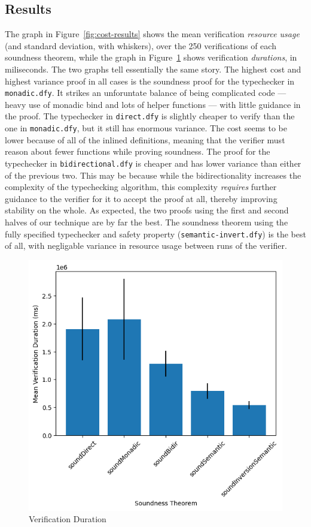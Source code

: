 \documentclass[sigplan,review,screen,anonymous]{acmart}
\begin{document}
\subsection*{Results}
The graph in Figure~\ref{fig:cost-results} shows the mean verification \emph{resource usage} (and standard deviation, with whiskers), over the 250 verifications of each soundness theorem,
while the graph in Figure~\ref{fig:dur-results} shows verification \emph{durations}, in miliseconds. The two graphs tell essentially the same story.
The highest cost and highest variance proof in all cases is the soundness proof for the typechecker in \texttt{monadic.dfy}. It strikes an unforuntate balance of being complicated code --- heavy use of monadic bind and lots of helper functions --- with little guidance in the proof.
The typechecker in \texttt{direct.dfy} is slightly cheaper to verify than the one in \texttt{monadic.dfy}, but it still has enormous variance. The cost seems to be lower because of all of the inlined definitions,
meaning that the verifier must reason about fewer functions while proving soundness.
The proof for the typechecker in \texttt{bidirectional.dfy} is cheaper and has lower variance than either of the previous two. This may be because while the bidirectionality increases the complexity of the typechecking algorithm,
this complexity \emph{requires} further guidance to the verifier for it to accept the proof at all, thereby improving stability on the whole.
As expected, the two proofs using the first and second halves of our technique
are by far the best. The soundness theorem using the fully specified typechecker and safety property (\texttt{semantic-invert.dfy})
is the best of all, with negligable variance in resource usage between runs of the verifier.

\begin{figure}
  \includegraphics[scale=0.5]{durgraph.png}
  \caption{Verification Duration}
  \label{fig:dur-results}
\end{figure}
\end{document}
